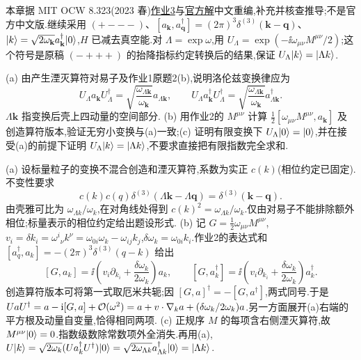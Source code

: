 本章据 MIT OCW 8.323(2023 春)\href{https://ocw.mit.edu/courses/8-323-relativistic-quantum-field-theory-i-spring-2023/mit8_323_s23_pset03.pdf}{作业3}与\href{https://ocw.mit.edu/courses/8-323-relativistic-quantum-field-theory-i-spring-2023/mit8_323_s23_pset_03sol.pdf}{官方解}中文重编,补充并核查推导;不是官方中文版.继续采用 $(+---)$、$[a_{\mathbf k},a^\dagger_{\mathbf q}]=(2\pi)^3\delta^{(3)}(\mathbf k-\mathbf q)$、$\lvert k\rangle=\sqrt{2\omega_{\mathbf k}}a^\dagger_{\mathbf k}\lvert 0\rangle$,$H$ 已减去真空能.对 $\Lambda=\exp\omega$,用 $U_\Lambda=\exp(-\ii\omega_{\mu\nu}M^{\mu\nu}/2)$;这个符号是原稿 $(-+++)$ 的抬降指标约定转换后的结果,保证 $U_\Lambda\lvert k\rangle=\lvert \Lambda k\rangle$.

\begin{exercise}
(a) 由产生湮灭算符对易子及作业1原题2(b),说明洛伦兹变换律应为
\[
U_\Lambda a_{\mathbf k}U_\Lambda^\dagger=\sqrt{\frac{\omega_{\Lambda\mathbf k}}{\omega_{\mathbf k}}}a_{\Lambda\mathbf k},\qquad
U_\Lambda a^\dagger_{\mathbf k}U_\Lambda^\dagger=\sqrt{\frac{\omega_{\Lambda\mathbf k}}{\omega_{\mathbf k}}}a^\dagger_{\Lambda\mathbf k}.
\]
$\Lambda\mathbf k$ 指变换后壳上四动量的空间部分.
(b) 用作业2的 $M^{\mu\nu}$ 计算 $\tfrac12[\omega_{\mu\nu}M^{\mu\nu},a_{\mathbf k}]$ 及创造算符版本,验证无穷小变换与(a)一致;(c) 证明有限变换下 $U_\Lambda\lvert 0\rangle=\lvert 0\rangle$,并在接受(a)的前提下证明 $U_\Lambda\lvert k\rangle=\lvert \Lambda k\rangle$,不要求直接把有限指数完全求和.
\end{exercise}
\begin{solution}
(a) 设标量粒子的变换不混合创造和湮灭算符,系数为实正 $c(k)$(相位约定已固定).不变性要求
\[
c(k)c(q)\delta^{(3)}(\Lambda\mathbf k-\Lambda\mathbf q)=\delta^{(3)}(\mathbf k-\mathbf q).
\]
由壳雅可比为 $\omega_{\Lambda k}/\omega_k$,在对角线处得到 $c(k)^2=\omega_{\Lambda k}/\omega_k$.仅由对易子不能排除额外相位;标量表示的相位约定给出题设形式.
(b) 记 $G=\tfrac12\omega_{\mu\nu}M^{\mu\nu}$,$v_i=\delta k_i=\omega^i{}_\nu k^\nu=\omega_{0i}\omega_k-\omega_{ij}k_j$,$\delta\omega_k=\omega_{0i}k_i$.作业2的表达式和 $[a^\dagger_q,a_k]=-(2\pi)^3\delta^{(3)}(q-k)$ 给出
\[
[G,a_k]=\ii\left(v_i\partial_{k_i}+\frac{\delta\omega_k}{2\omega_k}\right)a_k,\qquad
[G,a_k^\dagger]=\ii\left(v_i\partial_{k_i}+\frac{\delta\omega_k}{2\omega_k}\right)a_k^\dagger.
\]
创造算符版本可将第一式取厄米共轭;因 $[G,a]^\dagger=-[G,a^\dagger]$,两式同号.于是 $U aU^\dagger=a-\mathrm i[G,a]+\mathcal O(\omega^2)=a+v\cdot\nabla_k a+(\delta\omega_k/2\omega_k)a$.另一方面展开(a)右端的平方根及动量自变量,恰得相同两项.
(c) 正规序 $M$ 的每项含右侧湮灭算符,故 $M^{\mu\nu}\lvert 0\rangle=0$.指数级数除常数项外全消失.再用(a),
$U\lvert k\rangle=\sqrt{2\omega_k}(Ua_k^\dagger U^\dagger)\lvert 0\rangle=\sqrt{2\omega_{\Lambda k}}a^\dagger_{\Lambda k}\lvert 0\rangle=\lvert \Lambda k\rangle$.
\end{solution}


